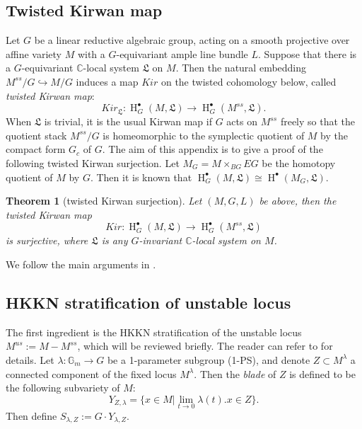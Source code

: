 \documentclass[12pt]{amsart}
\newtheorem{theorem}{Theorem}[section]
\theoremstyle{definition}
\theoremstyle{remark}
\numberwithin{equation}{section}
\newcommand{\CC}{\mathbb{C}}
\newcommand{\GG}{\mathbb{G}}
\newcommand{\arw}{\longrightarrow}
\newcommand{\Hdot}{\operatorname{H}}
\begin{document}
\subsection{Twisted Kirwan map}
Let $G$ be a linear reductive algebraic group, acting on a smooth projective over affine variety $M$ with a $G$-equivariant ample line bundle $L$. Suppose that there is a $G$-equivariant $\CC$-local system $\mathfrak{L}$ on $M$. Then the natural embedding $M^{ss}/G\hookrightarrow M/G$ induces a map $Kir$ on the twisted cohomology below, called \emph{twisted Kirwan map}:
$$Kir_{\mathfrak{L}}: \Hdot^{\bullet}_G(M, \mathfrak{L})\arw \Hdot^{\bullet}_G(M^{ss}, \mathfrak{L}).$$ 
When $\mathfrak{L}$ is trivial, it is the usual Kirwan map \cite{kirwan1984cohomology} if $G$ acts on $M^{ss}$ freely so that the quotient stack $M^{ss}/G$ is homeomorphic to the symplectic quotient of $M$ by the compact form $G_c$ of $G$. The aim of this appendix is to give a proof of the following twisted Kirwan surjection. Let $M_G=M\times_{BG} EG$ be the homotopy quotient of $M$ by $G$. Then it is known that $\Hdot^{\bullet}_G(M, \mathfrak{L})\cong \Hdot^{\bullet}(M_G, \mathfrak{L})$.
\begin{theorem}[twisted Kirwan surjection]\label{thm:twistedkirwan}
    Let $(M, G, L)$ be above, then the twisted Kirwan map 
    $$Kir: \Hdot^{\bullet}_G(M, \mathfrak{L})\arw \Hdot^{\bullet}_G(M^{ss}, \mathfrak{L})$$ 
    is surjective, where $\mathfrak{L}$ is any $G$-invariant $\CC$-local system on $M$. 
\end{theorem}
We follow the main arguments in \cite{kirwan1984cohomology}. 
\subsection{HKKN stratification of unstable locus} \label{app:hkkn}The first ingredient is the HKKN stratification of the unstable locus $M^{us}:=M-M^{ss}$, which will be reviewed briefly. The reader can refer to \cite{kirwan1984cohomology} for details. 
Let $\lambda: \GG_m\arw G$ be a 1-parameter subgroup (1-PS), and denote $Z\subset M^{\lambda}$ a connected component of the fixed locus $M^{\lambda}$. Then the \emph{blade} of $Z$ is defined to be the following subvariety of $M$:
$$Y_{Z,\lambda}=\{x\in M| \lim_{t\to 0}\lambda(t).x\in Z\}.$$
Then define $S_{\lambda,Z}:=G\cdot Y_{\lambda, Z}$. 
\end{document}
